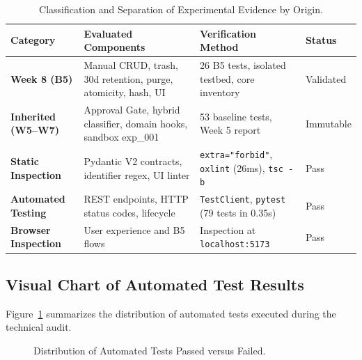 \documentclass[11pt,a4paper]{article}
\begin{document}
\begin{table}[H]
\centering
\small
\begin{tabularx}{\textwidth}{lp{5.0cm}p{4.2cm}l}
\toprule
\textbf{Category} & \textbf{Evaluated Components} & \textbf{Verification Method} & \textbf{Status} \\
\midrule
\textbf{Week 8 (B5)} & Manual CRUD, trash, 30d retention, purge, atomicity, hash, UI & 26 B5 tests, isolated testbed, core inventory & Validated \\
\textbf{Inherited (W5--W7)} & Approval Gate, hybrid classifier, domain hooks, sandbox exp\_001 & 53 baseline tests, Week 5 report & Immutable \\
\textbf{Static Inspection} & Pydantic V2 contracts, identifier regex, UI linter & \texttt{extra="forbid"}, \texttt{oxlint} (26ms), \texttt{tsc -b} & Pass \\
\textbf{Automated Testing} & REST endpoints, HTTP status codes, lifecycle & \texttt{TestClient}, \texttt{pytest} (79 tests in 0.35s) & Pass \\
\textbf{Browser Inspection} & User experience and B5 flows & Inspection at \texttt{localhost:5173} & Pass \\
\bottomrule
\end{tabularx}
\caption{Classification and Separation of Experimental Evidence by Origin.}
\label{tab:origen_evidencia_en}
\end{table}

\subsection{Visual Chart of Automated Test Results}
Figure~\ref{fig:chart_tests_en} summarizes the distribution of automated tests executed during the technical audit.

\begin{figure}[H]
\centering
{}
\caption{Distribution of Automated Tests Passed versus Failed.}
\label{fig:chart_tests_en}
\end{figure}
\end{document}
